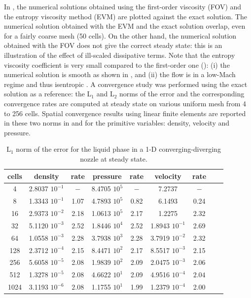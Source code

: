 %
In , the numerical solutions obtained using the first-order viscosity (FOV) and the entropy viscosity method (EVM) are plotted against the exact solution. The numerical solution obtained with the EVM and the exact solution overlap, even for a fairly coarse mesh (50 cells).
On the other hand, the numerical solution obtained with the FOV does not give the correct steady state: this is an illustration of the effect of ill-scaled dissipative terms. 
%
Note that the entropy viscosity coefficient is very small compared to the first-order one (): (i) the numerical solution is smooth as shown in , and (ii) the flow is in a low-Mach regime and thus isentropic . A convergence study was performed using the exact solution as a reference: the L$_1$ and L$_2$ norms of the error and the corresponding convergence rates are computed at steady state on various uniform mesh from 4 to 256 cells.
Spatial convergence results using linear finite elements are reported in these two norms in  and  for the primitive variables: density, velocity and pressure.
%
\begin{table}[H]
\begin{center}
 \caption{\label{tbl:l1_norm_liq} L$_1$ norm of the error for the liquid phase in a 1-D converging-diverging nozzle at steady state.}
 \begin{tabular}{|c|c|c|c|c|c|c|c|c|}
 \hline
cells & density         & rate   & pressure        & rate    & velocity         & rate     \\ \hline
4    & 2.8037 $10^{-1}$ & $-$    & 8.4705 $10^{5}$ & $-$     & 7.2737           & $-$      \\ \hline
8    & 1.3343 $10^{-1}$ & 1.07 & 4.7893 $10^{5}$ & 0.82 & 6.1493           & 0.24 \\ \hline
16   & 2.9373 $10^{-2}$ & 2.18 & 1.0613 $10^{5}$ & 2.17  & 1.2275           & 2.32   \\ \hline
32   & 5.1120 $10^{-3}$ & 2.52 & 1.8446 $10^{4}$ & 2.52  & 1.8943 $10^{-1}$ & 2.69   \\ \hline
64   & 1.0558 $10^{-3}$ & 2.28 & 3.7938 $10^{3}$ & 2.28  & 3.7919 $10^{-2}$ & 2.32   \\ \hline
128  & 2.3712 $10^{-4}$ & 2.15 & 8.4471 $10^{2}$ & 2.17  & 8.5517 $10^{-3}$ & 2.15   \\ \hline
256  & 5.6058 $10^{-5}$ & 2.08 & 1.9839 $10^{2}$ & 2.09  & 2.0475 $10^{-3}$ & 2.06   \\ \hline
512  & 1.3278 $10^{-5}$ & $2.08$ & 4.6622 $10^{1}$ & 2.09  & 4.9516 $10^{-4}$ & $2.04$   \\ \hline
1024  & 3.1193 $10^{-6}$ & $2.08$ & 1.1755 $10^{1}$ & 1.99  & 1.2379 $10^{-4}$ & 2.00   \\ \hline
\end{tabular}
\end{center}
\end{table}

